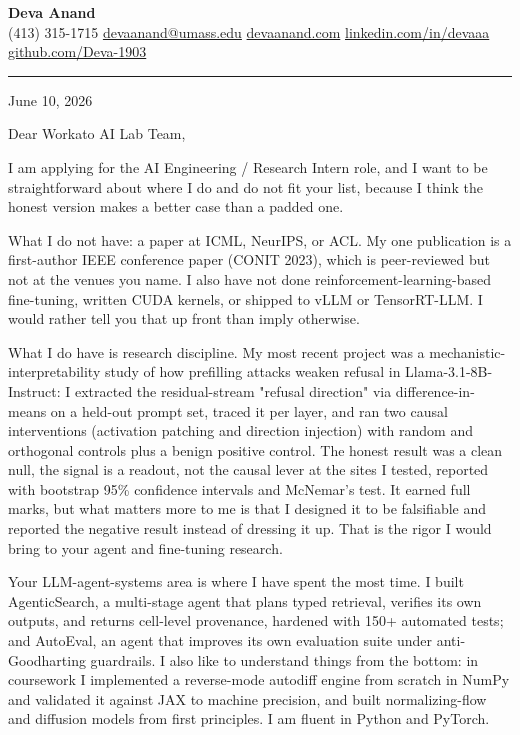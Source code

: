 \documentclass[letterpaper,11pt]{article}
\begin{document}
\pagestyle{empty}
\begin{center}
    {\LARGE \bfseries \textcolor{ResumeNavy}{Deva Anand}} \\ \vspace{4pt}
    \small
    (413) 315-1715 \enspace\textbar\enspace
    \href{mailto:devaanand@umass.edu}{devaanand@umass.edu} \enspace\textbar\enspace
    \href{https://devaanand.com}{devaanand.com} \enspace\textbar\enspace
    \href{https://linkedin.com/in/devaaa/}{linkedin.com/in/devaaa} \enspace\textbar\enspace
    \href{https://github.com/Deva-1903}{github.com/Deva-1903}
\end{center}
\vspace{4pt}
\textcolor{ResumeNavy}{\rule{\textwidth}{0.8pt}}
\vspace{2pt}

June 10, 2026

Dear Workato AI Lab Team,

I am applying for the AI Engineering / Research Intern role, and I want to be straightforward about where I do and do not fit your list, because I think the honest version makes a better case than a padded one.

What I do not have: a paper at ICML, NeurIPS, or ACL. My one publication is a first-author IEEE conference paper (CONIT 2023), which is peer-reviewed but not at the venues you name. I also have not done reinforcement-learning-based fine-tuning, written CUDA kernels, or shipped to vLLM or TensorRT-LLM. I would rather tell you that up front than imply otherwise.

What I do have is research discipline. My most recent project was a mechanistic-interpretability study of how prefilling attacks weaken refusal in Llama-3.1-8B-Instruct: I extracted the residual-stream "refusal direction" via difference-in-means on a held-out prompt set, traced it per layer, and ran two causal interventions (activation patching and direction injection) with random and orthogonal controls plus a benign positive control. The honest result was a clean null, the signal is a readout, not the causal lever at the sites I tested, reported with bootstrap 95\% confidence intervals and McNemar's test. It earned full marks, but what matters more to me is that I designed it to be falsifiable and reported the negative result instead of dressing it up. That is the rigor I would bring to your agent and fine-tuning research.

Your LLM-agent-systems area is where I have spent the most time. I built AgenticSearch, a multi-stage agent that plans typed retrieval, verifies its own outputs, and returns cell-level provenance, hardened with 150+ automated tests; and AutoEval, an agent that improves its own evaluation suite under anti-Goodharting guardrails. I also like to understand things from the bottom: in coursework I implemented a reverse-mode autodiff engine from scratch in NumPy and validated it against JAX to machine precision, and built normalizing-flow and diffusion models from first principles. I am fluent in Python and PyTorch.
\end{document}
